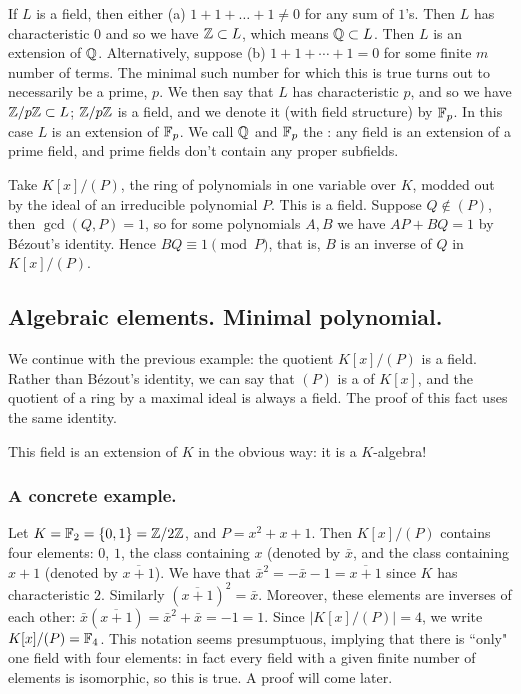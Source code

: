 \begin{ex}
If $L$ is a field, then either (a) $1 + 1 + \ldots + 1 \neq 0$ for any sum of $1$'s. Then $L$ has characteristic $0$ and so we have $\mathbb{Z} \subset L$, which means $\mathbb{Q} \subset L$. Then $L$ is an extension of $\mathbb{Q}$. Alternatively, suppose (b) $1 + 1 + \dotsb + 1 = 0$ for some finite $m$ number of terms. The minimal such number for which this is true turns out to necessarily be a prime, $p$. We then say that $L$ has characteristic $p$, and so we have $\mathbb{Z} / p\mathbb{Z} \subset L$; $\mathbb{Z} / p\mathbb{Z}$ is a field, and we denote it (with field structure) by $\mathbb{F}_p$. In this case $L$ is an extension of $\mathbb{F}_p$. We call $\mathbb{Q}$ and $\mathbb{F}_p$ the : any field is an extension of a prime field, and prime fields don't contain any proper subfields.
\end{ex}

\begin{ex}
Take $K[x]/(P)$, the ring of polynomials in one variable over $K$, modded out by the ideal of an irreducible polynomial $P$. This is a field. Suppose $Q \notin (P)$, then $\gcd(Q, P) = 1$, so for some polynomials $A, B$ we have $AP + BQ = 1$ by B\'{e}zout's identity. Hence $BQ \equiv 1 \pmod P$, that is, $B$ is an inverse of $Q$ in $K[x]/(P)$.
\end{ex}

\subsection{Algebraic elements. Minimal polynomial.}
We continue with the previous example: the quotient $K[x]/(P)$ is a field. Rather than B\'{e}zout's identity, we can say that $(P)$ is a  of $K[x]$, and the quotient of a ring by a maximal ideal is always a field. The proof of this fact uses the same identity.

This field is an extension of $K$ in the obvious way: it is a $K$-algebra!

\subsubsection{A concrete example.} 
Let $K = \mathbb{F}_2 = \{0, 1\} = \mathbb{Z} / 2\mathbb{Z}$, and $P = x^2 + x + 1$. Then $K[x] / (P)$ contains four elements: $0$, $1$, the class containing $x$ (denoted by $\bar{x}$, and the class containing $x + 1$ (denoted by $\overline{x + 1}$). We have that $\bar{x}^2 = -\bar{x} - 1 = \overline{x + 1}$ since $K$ has characteristic $2$. Similarly $(\overline{x + 1})^2 = \bar{x}$. Moreover, these elements are inverses of each other: $\bar{x}(\overline{x + 1}) = \bar{x}^2 + \bar{x} = -1 = 1$. Since $|K[x] / (P)| = 4$, we write $K[x] / (P) = \mathbb{F}_4$. This notation seems presumptuous, implying that there is ``only" one field with four elements: in fact every field with a given finite number of elements is isomorphic, so this is true. A proof will come later.

